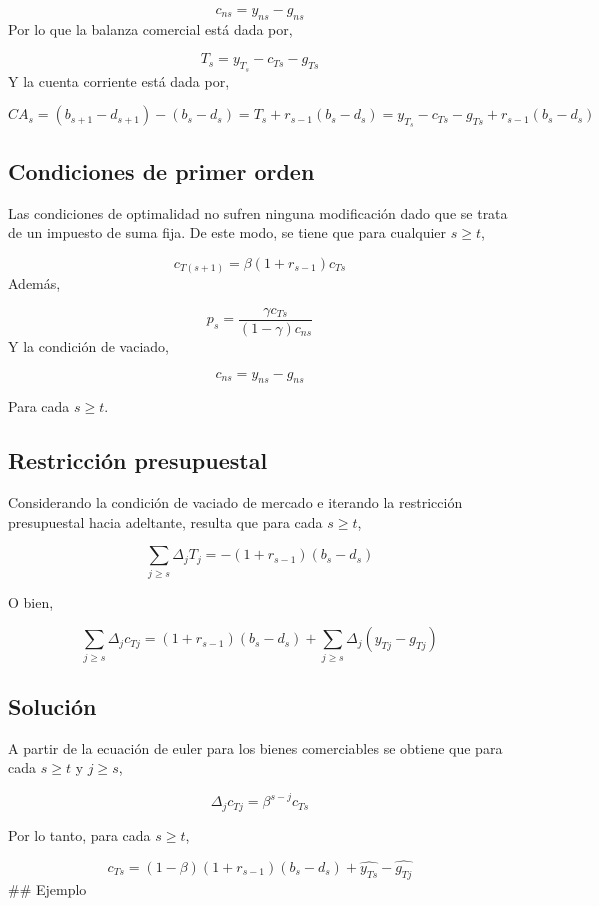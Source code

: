 \documentclass[]{article}
\begin{document}
\[
c_{ns} = y_{ns} - g_{ns}
\] Por lo que la balanza comercial está dada por,

\[
T_s = y_{T_s} - c_{Ts}-g_{Ts}
\] Y la cuenta corriente está dada por,

\[
CA_s = (b_{s+1}-d_{s+1})-(b_s-d_s) = T_s + r_{s-1}(b_s-d_s)  = y_{T_s} - c_{Ts}-g_{Ts} + r_{s-1}(b_s-d_s)
\]

\subsection{Condiciones de primer
orden}\label{condiciones-de-primer-orden-5}

Las condiciones de optimalidad no sufren ninguna modificación dado que
se trata de un impuesto de suma fija. De este modo, se tiene que para
cualquier \(s \geq t\),

\[
c_{T(s+1)} = \beta(1+r_{s-1})c_{Ts}
\] Además,

\[
p_s = \frac{\gamma c_{Ts}}{(1-\gamma)c_{ns}}
\] Y la condición de vaciado,

\[
c_{ns} = y_{ns} - g_{ns}
\]

Para cada \(s \geq t\).

\subsection{Restricción presupuestal}\label{restriccion-presupuestal-5}

Considerando la condición de vaciado de mercado e iterando la
restricción presupuestal hacia adeltante, resulta que para cada
\(s\geq t\),

\[
\sum_{j\geq s}\Delta_jT_j = -(1+r_{s-1})(b_s-d_s)
\]

O bien,

\[
\sum_{j\geq s}\Delta_j c_{Tj} = (1+r_{s-1})(b_s-d_s) + \sum_{j \geq s}\Delta_j (y_{Tj} - g_{Tj})
\]

\subsection{Solución}\label{solucion-4}

A partir de la ecuación de euler para los bienes comerciables se obtiene
que para cada \(s \geq t\) y \(j \geq s\),

\[
\Delta_j c_{Tj} = \beta^{s-j}c_{Ts}
\]

Por lo tanto, para cada \(s \geq t\),

\[
c_{Ts} = (1-\beta)(1+r_{s-1})(b_s - d_s) + \widehat{y_{Ts}} - \widehat{g_{Tj}}
\] \#\# Ejemplo
\end{document}
